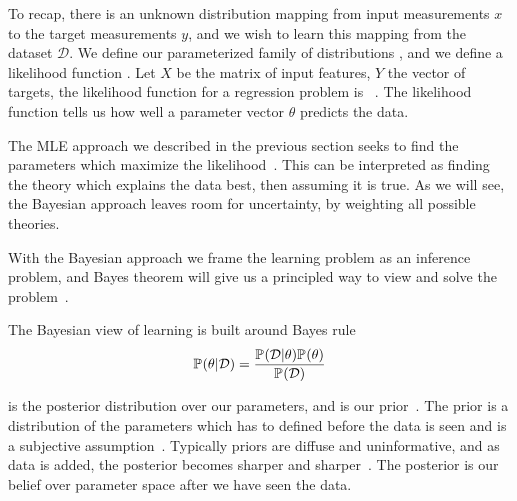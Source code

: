 \label{sub:bayesian_framework}
To recap, there is an unknown distribution  mapping from input measurements $x$ to the target measurements $y$, and we wish to learn this mapping from the dataset $\mathcal{D}$. We define our parameterized family of distributions , and we define a likelihood function . Let $X$ be the matrix of input features, $Y$ the vector of targets, the likelihood function for a regression problem is ~\citep{goodfellow2016deep}. The likelihood function tells us how well a parameter vector $\theta$ predicts the data. 

The MLE approach we described in the previous section seeks to find the parameters which maximize the likelihood~\cite[chapter~22]{mackay2003information}. This can be interpreted as finding the theory which explains the data best, then assuming it is true. As we will see, the Bayesian approach leaves room for uncertainty, by weighting all possible theories. 

With the Bayesian approach we frame the learning problem as an inference problem, and Bayes theorem will give us a principled way to view and solve the problem~\citep[chapter~2]{mackay2003information}.



The Bayesian view of learning is built around Bayes rule~\citep[chapter~2]{mackay2003information}
\begin{equation}
    \label{eq:bayes_rule}
    \mathbb{P}_{}(\theta| \mathcal{D}) = \frac{\mathbb{P}_{}(\mathcal{D}|\theta) \mathbb{P}_{}(\theta)}{\mathbb{P}_{}(\mathcal{D})}
\end{equation}

 is the posterior distribution over our parameters, and \pdf{\theta} is our prior~\citep{mackay2003information}. The prior is a distribution of the parameters which has to defined before the data is seen and is a subjective assumption~\citep{mackay2003information}. Typically priors are diffuse and uninformative, and as data is added, the posterior becomes sharper and sharper~\cite[chapter~5]{goodfellow2016deep}. The posterior is our belief over parameter space after we have seen the data. 

